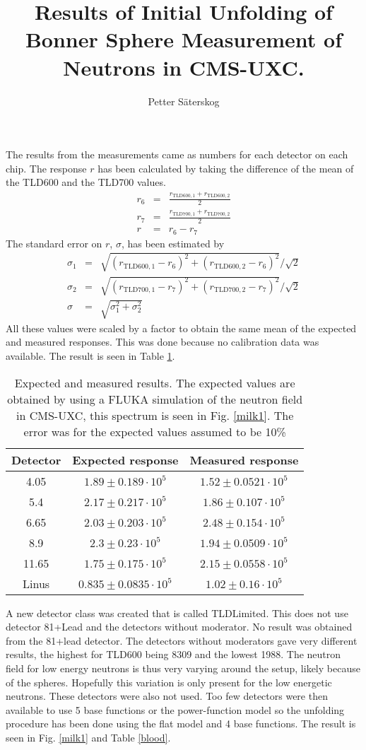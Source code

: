 \documentclass[12pt]{article}
\author{Petter Säterskog}
\title{Results of Initial Unfolding of Bonner Sphere Measurement of Neutrons in CMS-UXC.}
\begin{document}
\maketitle
The results from the measurements came as numbers for each detector on each chip. The response $r$ has been calculated by taking the difference of the mean of the TLD600 and the TLD700 values.
\begin{eqnarray}
 r_6&=&\frac{r_\mathrm{TLD600,1}+r_\mathrm{TLD600,2}}{2}\\
 r_7&=&\frac{r_\mathrm{TLD700,1}+r_\mathrm{TLD700,2}}{2}\\
 r&=&r_6-r_7
\end{eqnarray}
The standard error on $r$, $\sigma$, has been estimated by
\begin{eqnarray}
 \sigma_1&=&\sqrt{(r_\mathrm{TLD600,1}-r_6)^2+(r_\mathrm{TLD600,2}-r_6)^2}/\sqrt{2}\\
\sigma_2&=&\sqrt{(r_\mathrm{TLD700,1}-r_7)^2+(r_\mathrm{TLD700,2}-r_7)^2}/\sqrt{2}\\
\sigma&=&\sqrt{\sigma_1^2+\sigma_2^2}
\end{eqnarray}
All these values were scaled by a factor to obtain the same mean of the expected and measured responses. This was done because no calibration data was available. The result is seen in Table \ref{results}.
\begin{table}
\centering
\begin{tabular}{ccc}
\hline
\hline
Detector&Expected response&Measured response\\
\hline
4.05 & $1.89\pm0.189\cdot 10^5$ &$ 1.52\pm 0.0521\cdot 10^5$ \\
5.4 & $2.17\pm0.217\cdot 10^5$ &$ 1.86\pm 0.107\cdot 10^5$ \\
6.65 & $2.03\pm0.203\cdot 10^5$ &$ 2.48\pm 0.154\cdot 10^5$ \\
8.9 & $2.3\pm0.23\cdot 10^5$ &$ 1.94\pm 0.0509\cdot 10^5$ \\
11.65 & $1.75\pm0.175\cdot 10^5$ &$ 2.15\pm 0.0558\cdot 10^5$ \\
Linus & $0.835\pm0.0835\cdot 10^5$ &$ 1.02\pm 0.16\cdot 10^5$ \\
\hline
\hline
\end{tabular}
\caption{\label{results} Expected and measured results. The expected values are obtained by using a FLUKA simulation of the neutron field in CMS-UXC, this spectrum is seen in Fig. \ref{milk1}. The error was for the expected values assumed to be 10\%}
\end{table}
A new detector class was created that is called TLDLimited. This does not use detector 81+Lead and the detectors without moderator. No result was obtained from the 81+lead detector. The detectors without moderators gave very different results, the highest for TLD600 being 8309 and the lowest 1988. The neutron field for low energy neutrons is thus very varying around the setup, likely because of the spheres. Hopefully this variation is only present for the low energetic neutrons. These detectors were also not used. Too few detectors were then available to use 5 base functions or the power-function model so the unfolding procedure has been done using the flat model and 4 base functions. The result is seen in Fig. \ref{milk1} and Table \ref{blood}.
\end{document}
